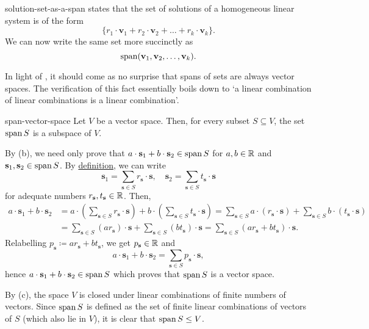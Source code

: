 \begin{remark}{}{solution-set-as-a-span}
  states
 that the set of solutions of a homogeneous linear system is of the form
 \[
  \{r_1 \cdot \mathbf{v}_1 + r_2 \cdot \mathbf{v}_2 + \ldots + r_k \cdot
  \mathbf{v}_k\}.
 \]
 We can now write the same set more succinctly as
 \[
  \operatorname{span} (\mathbf{v}_1,\mathbf{v}_2,\ldots,\mathbf{v}_k).
 \]
\end{remark}

In light of , it should come as
no surprise that spans of sets are always vector spaces. The verification of
this fact essentially boils down to `a linear combination of linear combinations
is a linear combination'.

\begin{lemma}{}{span-vector-space}
 Let $V$ be a vector space. Then, for every subset $S \subseteq V$, the set
 $\operatorname{span} S$ is a subspace of $V$.
\end{lemma}
\begin{lemproof}
 By  (b), we need only prove
 that $a \cdot \mathbf{s}_1 + b \cdot \mathbf{s}_2 \in \operatorname{span} S$ for $a,b \in \mathbb{R}$
 and $\mathbf{s}_1,\mathbf{s}_2 \in \operatorname{span} S$. By \hyperref[def:span]{definition},
 we can write
 \[
  \mathbf{s}_1 = \sum_{\mathbf{s} \in S} r_{\mathbf{s}} \cdot \mathbf{s}, \quad
  \mathbf{s}_2 = \sum_{\mathbf{s} \in S} t_{\mathbf{s}} \cdot \mathbf{s}
 \]
 for adequate numbers $r_{\mathbf{s}},t_{\mathbf{s}} \in \mathbb{R}$. Then,
 \begin{align*}
  a \cdot \mathbf{s}_1 + b \cdot \mathbf{s}_2 &= a \cdot \left(
  \sum_{\mathbf{s} \in S} r_{\mathbf{s}} \cdot \mathbf{s}\right) + b \cdot
  \left( \sum_{\mathbf{s} \in S} t_{\mathbf{s}} \cdot \mathbf{s} \right) =
  \sum_{\mathbf{s} \in S} a \cdot (r_{\mathbf{s}} \cdot \mathbf{s}) +
  \sum_{\mathbf{s} \in S} b \cdot (t_{\mathbf{s}} \cdot \mathbf{s})\\
  &= \sum_{\mathbf{s} \in S} (ar_{\mathbf{s}}) \cdot \mathbf{s} +
   \sum_{\mathbf{s} \in S} (bt_{\mathbf{s}}) \cdot \mathbf{s} =
   \sum_{\mathbf{s} \in S} (ar_{\mathbf{s}} + bt_{\mathbf{s}}) \cdot \mathbf{s}.
 \end{align*}
 Relabelling $p_{\mathbf{s}} \coloneqq ar_{\mathbf{s}} + bt_{\mathbf{s}}$, we
 get $p_{\mathbf{s}} \in \mathbb{R}$ and
 \[
  a \cdot \mathbf{s}_1 + b \cdot \mathbf{s}_2 = \sum_{\mathbf{s} \in S}
  p_{\mathbf{s}} \cdot \mathbf{s},
 \]
 hence $a \cdot \mathbf{s}_1 + b \cdot \mathbf{s}_2 \in \operatorname{span} S$ which proves
 that $\operatorname{span} S$ is a vector space.

 By  (c), the space $V$ is
 closed under linear combinations of finite numbers of vectors. Since $\operatorname{span} S$
 is defined as the set of finite linear combinations of vectors of $S$ (which
 also lie in $V$), it is clear that $\operatorname{span} S \leq V$.
\end{lemproof}

